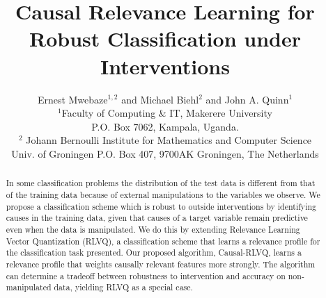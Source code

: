 \documentclass{esannV2}
\begin{document}
\title{Causal Relevance Learning for Robust Classification under Interventions}

\author{Ernest Mwebaze$^{1,2}$ and Michael Biehl$^2$ and John A. Quinn$^1$ 
%
%
\vspace{.3cm}\\
%
$^1$Faculty of Computing \& IT, Makerere University \\
P.O. Box 7062, Kampala, Uganda.%
\vspace{.1cm}\\
$^2$ Johann Bernoulli Institute for Mathematics and Computer Science \\
Univ. of Groningen P.O. Box 407, 9700AK Groningen, The Netherlands\\
}

\maketitle

\begin{abstract}
In some classification problems the distribution of the test data is different from that of the training data because of external manipulations to the variables we observe. We propose a classification scheme which is robust to outside interventions by identifying causes in the training data, given that causes of a target variable remain predictive even when the data is manipulated. We do this by extending Relevance Learning Vector Quantization (RLVQ), a classification scheme that learns a relevance profile for the classification task presented. Our proposed algorithm, Causal-RLVQ, learns a relevance profile that weights causally relevant features more strongly. The algorithm can determine a tradeoff between robustness to intervention and accuracy on non-manipulated data, yielding RLVQ as a special case.
\end{abstract}
\end{document}
